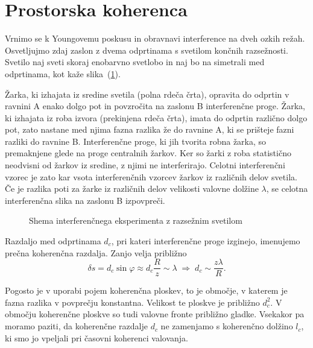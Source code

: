 \section{Prostorska koherenca}
\label{Prostorska-koherenca}
Vrnimo se k Youngovemu poskusu in obravnavi interference
 na dveh ozkih režah. Osvetljujmo zdaj zaslon z dvema
odprtinama s svetilom končnih razsežnosti. Svetilo naj sveti skoraj enobarvno
svetlobo in naj bo na simetrali med odprtinama, kot kaže slika~(\ref{fig:shema-interferenca}).

Žarka, ki izhajata iz sredine svetila (polna rdeča črta), 
opravita do odprtin v ravnini A enako dolgo pot in povzročita na zaslonu B 
interferenčne proge. Žarka, ki izhajata iz roba izvora (prekinjena rdeča črta), 
imata do odprtin različno dolgo pot, zato nastane med njima fazna razlika že do ravnine A, 
ki se prišteje fazni razliki do ravnine B. Interferenčne proge, ki jih tvorita 
robna žarka, so premaknjene glede na proge centralnih žarkov. Ker so žarki z roba
statistično neodvisni od žarkov iz sredine, z njimi
ne interferirajo. Celotni interferenčni vzorec je zato kar vsota interferenčnih
vzorcev žarkov iz različnih delov svetila. Če je razlika poti za žarke
iz različnih delov velikosti valovne dolžine $\lambda$, se celotna
interferenčna slika na zaslonu B izpovpreči.

\begin{figure}[h]
\centering
\def\svgwidth{140truemm} 

\caption{Shema interferenčnega eksperimenta z razsežnim svetilom}
\label{fig:shema-interferenca}
\end{figure}

Razdaljo med odprtinama $d_c$, pri kateri interferenčne proge
izginejo, imenujemo prečna koherenčna razdalja. 
Zanjo velja približno 
\begin{equation}
\delta s = d_c\sin\varphi\approx d_c\frac{R}{z}\sim\lambda\;\Rightarrow\;
d_{c}\sim\frac{z\lambda}{R}.
\label{eq:prost_koh}
\end{equation}
\begin{remark}
Pogosto je v uporabi
pojem koherenčna ploskev, to je območje, 
v katerem je fazna razlika v povprečju konstantna. Velikost te ploskve je približno $d_{c}^{2}$.
V območju koherenčne ploskve so tudi valovne fronte približno gladke.
Vsekakor pa moramo paziti, da koherenčne razdalje $d_c$ ne zamenjamo
s koherenčno dolžino $l_c$, ki smo jo vpeljali pri časovni koherenci valovanja. 
\end{remark}

